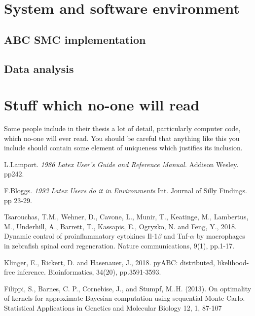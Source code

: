 \documentclass[12pt,a4paper]{report}
\begin{document}
\appendix

\chapter{System and software environment}

\section{ABC SMC implementation}

\section{Data analysis}

\chapter{Stuff which no-one will read}

Some people include in their thesis a lot of detail, particularly
computer code, which no-one will ever read. You should be careful that
anything like this you include should contain some element of uniqueness
which justifies its inclusion.

\begin{thebibliography}{100}

 L.Lamport. {\em 1986 Latex User's Guide
and Reference Manual.} Addison Wesley. pp242.

 F.Bloggs. {\em 1993 Latex Users do it
in Environments} Int. Journal of Silly Findings. pp 23-29.

 Tsarouchas, T.M., Wehner, D., Cavone, L., Munir, T., Keatinge, M., Lambertus, M., Underhill, A., Barrett, T., Kassapis, E., Ogryzko, N. and Feng, Y., 2018. Dynamic control of proinflammatory cytokines Il-1$\beta$ and Tnf-$\alpha$ by macrophages in zebrafish spinal cord regeneration. Nature communications, 9(1), pp.1-17.

 Klinger, E., Rickert, D. and Hasenauer, J., 2018. pyABC: distributed, likelihood-free inference. Bioinformatics, 34(20), pp.3591-3593.

 Filippi, S., Barnes, C. P., Cornebise, J., and Stumpf, M..H. (2013). On optimality of kernels for approximate Bayesian computation using sequential Monte Carlo. Statistical Applications in Genetics and Molecular Biology 12, 1, 87-107

\end{thebibliography}
\end{document}
